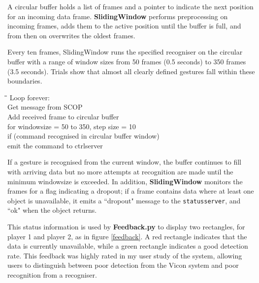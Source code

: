 \documentclass[12pt,a4,notitlepage]{report}
\renewcommand{\_}{\texttt{\symbol{95}}}
\newcommand{\<}{\texttt{\symbol{60}}}
\renewcommand{\>}{\texttt{\symbol{62}}}
\newcommand{\class}[1]{\textbf{#1}}
\newcommand{\variable}[1]{\texttt{#1}}
\newenvironment{pseudocode}{\begin{slshape}\begin{tabbing}\hspace*{0.5cm}\=\hspace*{0.5cm}\=\hspace*{0.5cm}\= \kill }{\end{tabbing}\end{slshape}}
\begin{document}
A circular buffer holds a list of frames and a pointer to indicate the next position for an incoming data frame. \class{SlidingWindow} performs preprocessing on  incoming frames, adds them to the active position until the buffer is full, and from then on overwrites the oldest frames.

Every ten frames, SlidingWindow runs the specified recogniser on the circular buffer with a range of window sizes from 50 frames (0.5 seconds) to 350 frames (3.5 seconds). Trials show that almost all clearly defined gestures fall within these boundaries.

\begin{pseudocode}
Loop forever: \\
\>	Get message from SCOP \\
\>	Add received frame to circular buffer \\
\>\>    for windowsize = 50 to 350, step size = 10 \\
\>\>        if (command recognised in circular buffer window) \\
\>\>\>           emit the command to ctrlserver
\end{pseudocode}

If a gesture is recognised from the current window, the buffer continues to fill with arriving data but no more attempts at recognition are made until the minimum windowsize is exceeded. In addition, \class{SlidingWindow} monitors the frames for a flag indicating a dropout; if a frame contains data where at least one object is unavailable, it emits a ``dropout" message to the \variable{statusserver}, and ``ok" when the object returns.

This status information is used by \class{Feedback.py} to display two rectangles, for player 1 and player 2, as in figure \ref{feedback}. A red rectangle indicates that the data is currently unavailable, while a green rectangle indicates a good detection rate. This feedback was highly rated in my user study of the system, allowing users to distinguish between poor detection from the Vicon system and poor recognition from a recogniser.
\end{document}

